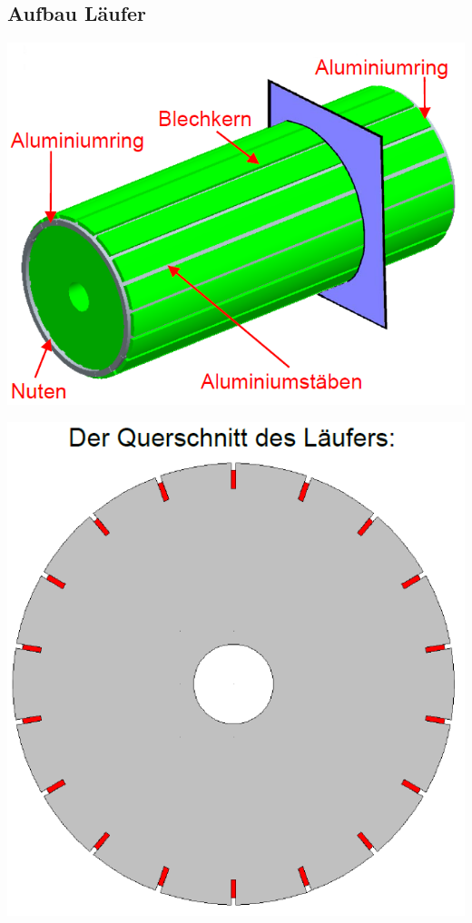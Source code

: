     \subsection{Aufbau Läufer}
    \begin{minipage}[b]{0.5\linewidth}
    	\includegraphics[scale = 0.4]{images/AsynchronRotor}
    \end{minipage}
    \begin{minipage}[b]{0.5\linewidth}
    	\includegraphics[scale = 0.4]{images/QuerschnittAsynchronrotor}
    \end{minipage}
